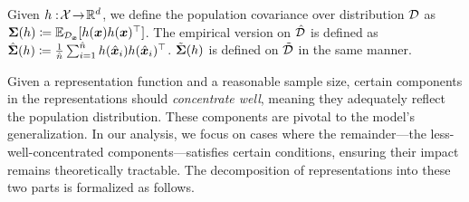 \begin{definition}
Given $h:\!{\mathcal{X}}\!\rightarrow\! {\mathbb{R}}^d $, we define the population covariance over distribution ${\mathcal{D}}$ as ${\bm{\Sigma}}(h)\coloneqq\mathbb{E}_{{\mathcal{D}}_{{\bm{x}}}}[ h({\bm{x}})h({\bm{x}})^\top ]$. The empirical version on $\hat{{\mathcal{D}}}$ is defined as $\hat{{\bm{\Sigma}}}(h) \coloneqq \frac{1}{\hat{n}} \sum_{i=1}^{\hat{n}}h(\hat{{\bm{x}}}_i)h(\hat{{\bm{x}}}_i)^\top $. $\tilde{{\bm{\Sigma}}}(h)$ is defined on $\tilde{{\mathcal{D}}}$ in the same manner.  
\end{definition}
{Given a representation function and a reasonable sample size, certain components in the representations should \emph{concentrate well}, meaning they adequately reflect the population distribution. These components are pivotal to the model's generalization. In our analysis, we focus on cases where the remainder—the less-well-concentrated components—satisfies certain conditions, ensuring their impact remains theoretically tractable. The decomposition of representations into these two parts is formalized as follows.} 

